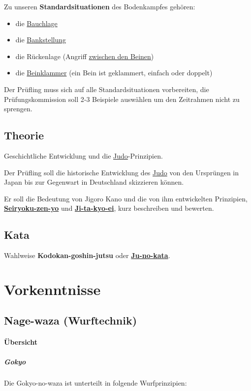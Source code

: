 \documentclass[justified, a4paper, notitlepage, captions=tableheading, nobib]{tufte-handout}
\begin{document}
Zu unseren \textbf{Standardsituationen} des Bodenkampfes gehören:
\begin{itemize}
\item die \hyperref[orgfae504a]{Bauchlage}
\item die \hyperref[org37bd524]{Bankstellung}
\item die Rückenlage (Angriff \hyperref[orgf285c69]{zwischen den Beinen})
\item die \hyperref[org36bef7c]{Beinklammer} (ein Bein ist geklammert, einfach oder doppelt)
\end{itemize}

Der Prüfling muss sich auf alle Standardsituationen vorbereiten, die Prüfungskommission soll 2‐3 Beispiele auswählen um den Zeitrahmen nicht zu sprengen.

\subsection{Theorie}
\label{sec:org4d6e4cf}
Geschichtliche Entwicklung und die \hyperref[org6f56467]{Judo}-Prinzipien.

Der Prüfling soll die historische Entwicklung des \hyperref[org6f56467]{Judo} von den Ursprüngen in Japan bis zur Gegenwart in Deutschland skizzieren können.

Er soll die Bedeutung von Jigoro Kano und die von ihm entwickelten Prinzipien, \textbf{\hyperref[orgb17970b]{Seiryoku-zen-yo}} und \textbf{\hyperref[org11da039]{Ji-ta-kyo-ei}}, kurz beschreiben und bewerten.

\subsection{Kata}
\label{sec:org05c04a1}
Wahlweise \textbf{Kodokan-goshin-jutsu} oder \textbf{\hyperref[orgde09d8a]{Ju-no-kata}}.


\newpage
\section{Vorkenntnisse }
\label{sec:org9837f88}

\subsection{Nage-waza (Wurftechnik)}
\label{sec:orgd81f8c3}

\paragraph{Übersicht }
\label{sec:orgca579f5}
\subparagraph{Gokyo}
\label{sec:org85819bd}
Die Gokyo-no-waza ist unterteilt in folgende Wurfprinzipien:
\end{document}

